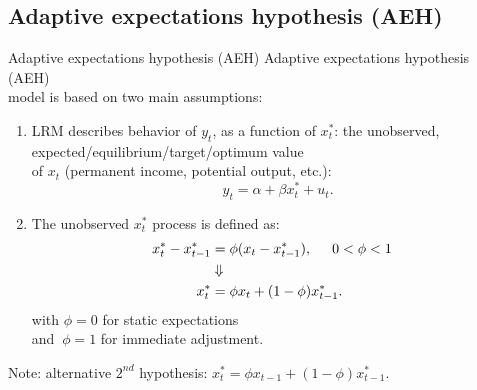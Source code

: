 \documentclass{beamer}
\begin{document}
\subsection{Adaptive expectations hypothesis (AEH)}
\begin{frame}{Adaptive expectations hypothesis (AEH)}
Adaptive expectations hypothesis (AEH) \\ model is based on two main assumptions:
\bigskip
\begin{enumerate}
\item LRM describes behavior of $y_t$, as a function of ${x}_t^\ast$: the unobserved, 
expected/equilibrium/target/optimum value \\of $x_t$ 
(permanent income, potential output, etc.):
\begin{equation}
~~~~y_t = \alpha + \beta x_t^\ast + u_t.\label{eqare1}
\end{equation}
\item The unobserved ${x}_t^\ast$ process is defined as:
\begin{equation} \label{eqare2}
\begin{aligned}
x^\ast_t - x^\ast_{t-1} & = \phi( x_t - x_{t-1}^\ast), \hspace{0.5cm} 0 < \phi < 1\\
 &  \Downarrow \\
x_t^\ast & =  \phi x_t + (1-\phi) x^\ast_{t-1}.
\end{aligned}
\end{equation}
with $\phi=0$ for static expectations\\ and $~\phi=1$ for immediate adjustment.
\end{enumerate}
\footnotesize{Note: alternative $2^{nd}$ hypothesis: $x_t^\ast =  \phi x_{t-1} + (1-\phi) x^\ast_{t-1}. $}
\end{frame}
\end{document}
